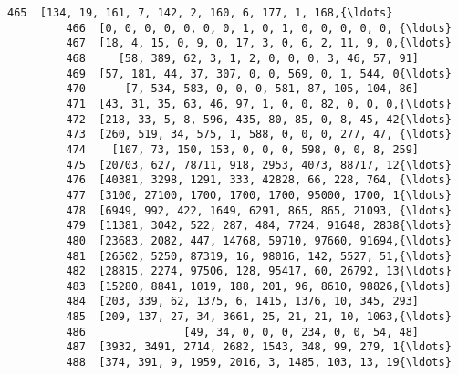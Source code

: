 \documentclass[11pt]{article}
\begin{document}
\begin{Verbatim}[commandchars=\\\{\}]
         465  [134, 19, 161, 7, 142, 2, 160, 6, 177, 1, 168,{\ldots}   
         466  [0, 0, 0, 0, 0, 0, 0, 1, 0, 1, 0, 0, 0, 0, 0, {\ldots}   
         467  [18, 4, 15, 0, 9, 0, 17, 3, 0, 6, 2, 11, 9, 0,{\ldots}   
         468     [58, 389, 62, 3, 1, 2, 0, 0, 0, 3, 46, 57, 91]   
         469  [57, 181, 44, 37, 307, 0, 0, 569, 0, 1, 544, 0{\ldots}   
         470      [7, 534, 583, 0, 0, 0, 581, 87, 105, 104, 86]   
         471  [43, 31, 35, 63, 46, 97, 1, 0, 0, 82, 0, 0, 0,{\ldots}   
         472  [218, 33, 5, 8, 596, 435, 80, 85, 0, 8, 45, 42{\ldots}   
         473  [260, 519, 34, 575, 1, 588, 0, 0, 0, 277, 47, {\ldots}   
         474    [107, 73, 150, 153, 0, 0, 0, 598, 0, 0, 8, 259]   
         475  [20703, 627, 78711, 918, 2953, 4073, 88717, 12{\ldots}   
         476  [40381, 3298, 1291, 333, 42828, 66, 228, 764, {\ldots}   
         477  [3100, 27100, 1700, 1700, 1700, 95000, 1700, 1{\ldots}   
         478  [6949, 992, 422, 1649, 6291, 865, 865, 21093, {\ldots}   
         479  [11381, 3042, 522, 287, 484, 7724, 91648, 2838{\ldots}   
         480  [23683, 2082, 447, 14768, 59710, 97660, 91694,{\ldots}   
         481  [26502, 5250, 87319, 16, 98016, 142, 5527, 51,{\ldots}   
         482  [28815, 2274, 97506, 128, 95417, 60, 26792, 13{\ldots}   
         483  [15280, 8841, 1019, 188, 201, 96, 8610, 98826,{\ldots}   
         484  [203, 339, 62, 1375, 6, 1415, 1376, 10, 345, 293]   
         485  [209, 137, 27, 34, 3661, 25, 21, 21, 10, 1063,{\ldots}   
         486               [49, 34, 0, 0, 0, 234, 0, 0, 54, 48]   
         487  [3932, 3491, 2714, 2682, 1543, 348, 99, 279, 1{\ldots}   
         488  [374, 391, 9, 1959, 2016, 3, 1485, 103, 13, 19{\ldots}   
         

\end{Verbatim}
\end{document}

